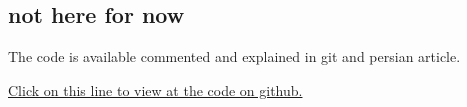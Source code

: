 \begin{flushleft}

\section{not here for now}
The code is available commented and explained in git and persian article.\linebreak

\href{https://github.com/MohsenDehbag/thesis-about-blockchain}{Click on this line to view at the code on github.}
\end{flushleft}
